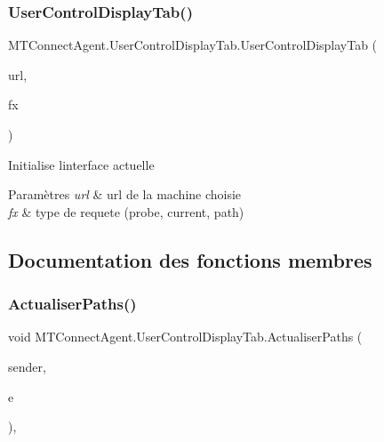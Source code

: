 \subsubsection{\texorpdfstring{User\+Control\+Display\+Tab()}{UserControlDisplayTab()}}
{\footnotesize\ttfamily M\+T\+Connect\+Agent.\+User\+Control\+Display\+Tab.\+User\+Control\+Display\+Tab (\begin{DoxyParamCaption}\item[{string}]{url,  }\item[{\mbox{\hyperlink{class_m_t_connect_agent_1_1_user_control_display_tab_a39c6241e9b8ef40634f8340676d557ec}{Functions}}}]{fx }\end{DoxyParamCaption})\hspace{0.3cm}{\ttfamily [inline]}}



Initialise l\textquotesingle{}interface actuelle 


\begin{DoxyParams}{Paramètres}
{\em url} & url de la machine choisie\\
\hline
{\em fx} & type de requete (probe, current, path)\\
\hline
\end{DoxyParams}


\subsection{Documentation des fonctions membres}
\mbox{\label{class_m_t_connect_agent_1_1_user_control_display_tab_a2f29e407545f62944defd9533dc895e0}} 
\subsubsection{\texorpdfstring{Actualiser\+Paths()}{ActualiserPaths()}}
{\footnotesize\ttfamily void M\+T\+Connect\+Agent.\+User\+Control\+Display\+Tab.\+Actualiser\+Paths (\begin{DoxyParamCaption}\item[{object}]{sender,  }\item[{Event\+Args}]{e }\end{DoxyParamCaption})\hspace{0.3cm}{\ttfamily [inline]}, {\ttfamily [private]}}



